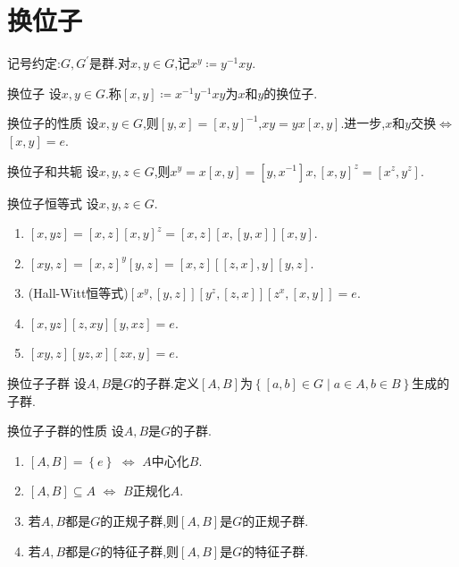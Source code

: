 \section{换位子}

记号约定:$G,G^{\prime}$是群.对$x,y\in G$,记$x^{y}\coloneq y^{-1}xy$.

\begin{definition}{换位子}{}
	设$x,y\in G$.称$\left[x,y\right]\coloneq x^{-1}y^{-1}xy$为$x$和$y$的换位子.
\end{definition}

\begin{proposition}{换位子的性质}{}
	设$x,y\in G$,则$\left[y,x\right]=\left[x,y\right]^{-1}$,$xy=yx\left[x,y\right]$.进一步,$x$和$y$交换$\iff$ $\left[x,y\right]=e$.
\end{proposition}

\begin{proposition}{换位子和共轭}{}
	设$x,y,z\in G$,则$x^{y}=x\left[x,y\right]=\left[y,x^{-1}\right]x,\left[x,y\right]^{z}=\left[x^{z},y^{z}\right]$.
\end{proposition}

\begin{theorem}{换位子恒等式}{}
	设$x,y,z\in G$.
	\begin{enumerate}
		\item $\left[x,yz\right]=\left[x,z\right]\left[x,y\right]^{z}=\left[x,z\right]\left[x,\left[y,x\right]\right]\left[x,y\right]$.
		\item $\left[xy,z\right]=\left[x,z\right]^{y}\left[y,z\right]=\left[x,z\right]\left[\left[z,x\right],y\right]\left[y,z\right]$.
		\item (Hall-Witt恒等式)$\left[x^{y},\left[y,z\right]\right]\left[y^{z},\left[z,x\right]\right]\left[z^{x},\left[x,y\right]\right]=e$.
		\item $\left[x,yz\right]\left[z,xy\right]\left[y,xz\right]=e$.
		\item $\left[xy,z\right]\left[yz,x\right]\left[zx,y\right]=e$.
	\end{enumerate}
\end{theorem}

\begin{definition}{换位子子群}{}
	设$A,B$是$G$的子群.定义$\left[A,B\right]$为$\left\{\left[a,b\right]\in G\middle|a\in A,b\in B\right\}$生成的子群.
\end{definition}

\begin{proposition}{换位子子群的性质}{}
	设$A,B$是$G$的子群.
	\begin{enumerate}
		\item $\left[A,B\right]=\left\{e\right\}$ $\iff$ $A$中心化$B$.
		\item $\left[A,B\right]\subseteq A$ $\iff$ $B$正规化$A$.
		\item 若$A,B$都是$G$的正规子群,则$\left[A,B\right]$是$G$的正规子群.
		\item 若$A,B$都是$G$的特征子群,则$\left[A,B\right]$是$G$的特征子群.
	\end{enumerate}
\end{proposition}

